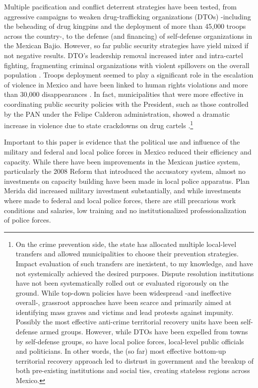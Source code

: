 \documentclass[12pt]{amsart}
\numberwithin{equation}{section}
\theoremstyle{definition}
\theoremstyle{definition}
\theoremstyle{definition}
\begin{document}
Multiple pacification and conflict deterrent strategies have been tested, from aggressive campaigns to weaken drug-trafficking organizations (DTOs) -including the beheading of drug kingpins and the deployment of more than 45,000 troops across the country-, to the defense (and financing) of self-defense organizations in the Mexican Bajio. However, so far public security strategies have yield mixed if not negative results. DTO's leadership removal increased inter and intra-cartel fighting, fragmenting criminal organizations with violent spillovers on the overall population \citep{guerrero_2011}. Troops deployment seemed to play a significant role in the escalation of violence in Mexico \citep{escalante_2011} and have been linked to human rights violations and more than 30,000 disappearances \citep{daly_etal_2012, moloeznik_etal_2012, magaloni_magaloni_razu_2018}. In fact, municipalities that were more effective in coordinating public security policies with the President, such as those controlled by the PAN under the Felipe Calderon administration, showed a dramatic increase in violence due to state crackdowns on drug cartels \citep{dell_2015}.\footnote{On the crime prevention side, the state has allocated multiple local-level transfers and allowed municipalities to choose their prevention strategies. Impact evaluation of such transfers are inexistent, to my knowledge, and have not systemically achieved the desired purposes. Dispute resolution institutions have not been systematically rolled out or evaluated rigorously on the ground. While top-down policies have been widespread -and ineffective overall-, grassroot approaches have been scarce and primarily aimed at identifying mass graves and victims and lead protests against impunity. Possibly the most effective anti-crime territorial recovery units have been self-defense armed groups. However, while DTOs have been expelled from towns by self-defense groups, so have local police forces, local-level public officials and politicians. In other words, the (so far) most effective bottom-up territorial recovery approach led to distrust in government and the breakup of both pre-existing institutions and social ties, creating stateless regions across Mexico.}

Important to this paper is evidence that the political use and influence of the military \citep{aguayo_2001, moloeznik_2010, lopez_gonzalez_2012} and federal and local police forces in Mexico \citep{zepeda_2010, sabet_2012, lopez_portillo_2012, davis_2017} reduced their efficiency and capacity. While there have been improvements in the Mexican justice system, particularly the 2008 Reform that introduced the accusatory system, almost no investments on capacity building have been made in local police apparatus. Plan Merida did increased military investment substantially, and while investments where made to federal and local police forces, there are still precarious work conditions and salaries, low training and no institutionalized professionalization of police forces. 
\end{document}
